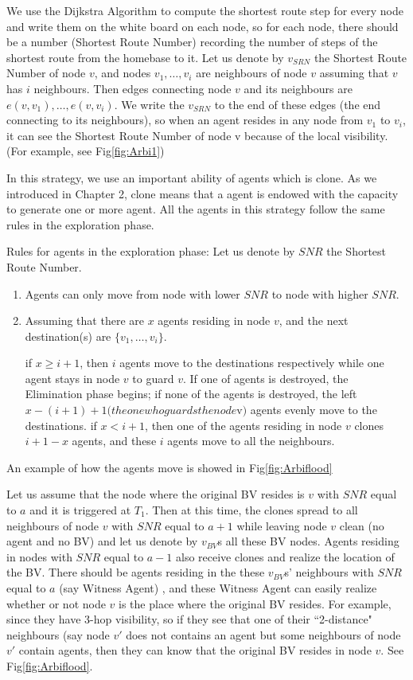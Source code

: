 We use the Dijkstra Algorithm to compute the shortest route step for every node and write them on the white board on each node, so for each node, there should be a number (Shortest Route Number) recording the number of steps of the shortest route from the homebase to it. Let us denote by $v_{SRN}$ the Shortest Route Number of node $v$, and nodes ${v_1, \ldots, v_i}$ are neighbours of node $v$ assuming that $v$ has $i$ neighbours. Then edges connecting node $v$ and its neighbours are $e(v, v_1), \ldots, e(v, v_i)$. We write the $v_{SRN}$ to the end of these edges (the end connecting to its neighbours), so when an agent resides in any node from $v_1$ to $v_i$, it can see the Shortest Route Number of node v because of the local visibility. (For example, see Fig\ref{fig:Arbi1}) 

In this strategy, we use an important ability of agents which is clone. As we introduced in Chapter 2, clone means that a agent is endowed with the capacity to generate one or more agent. All the agents in this strategy follow the same rules in the exploration phase.

Rules for agents in the exploration phase:
Let us denote by $SNR$ the Shortest Route Number.
\begin{enumerate}
\item Agents can only move from node with lower $SNR$ to node with higher $SNR$.
\item Assuming that there are $x$ agents residing in node $v$, and the next destination(s) are $\{v_1,\ldots, v_i\}$. 

        if $x\geq i+1$, then $i$ agents move to the destinations respectively while one agent stays in node $v$ to guard $v$. If one of agents is destroyed, the Elimination phase begins; if none of the agents is destroyed, the left $x-(i+1)+1(the one who guards the node $v$)$ agents evenly move to the destinations. 
        if $x< i+1$, then one of the agents residing in node $v$ clones $i+1-x$ agents, and these $i$ agents move to all the neighbours.
\end{enumerate}
An example of how the agents move is showed in Fig\ref{fig:Arbiflood}

Let us assume that the node where the original BV resides is $v$ with $SNR$ equal to $a$ and it is triggered at $T_1$. Then at this time, the clones spread to all neighbours of node $v$ with $SNR$ equal to $a+1$ while leaving node $v$ clean (no agent and no BV) and let us denote by $v_{BV}$s all these BV nodes.  Agents residing in nodes with $SNR$ equal to $a-1$ also receive clones and realize the location of the BV.  There should be agents residing in the these $v_{BV}$s' neighbours with $SNR$ equal to $a$ (say Witness Agent) , and these Witness Agent can easily realize whether or not node $v$ is the place where the original BV resides. For example, since they have 3-hop visibility, so if they see that one of their ``2-distance" neighbours (say node $v'$ does not contains an agent but some neighbours of node $v'$ contain agents, then they can know that the original BV resides in node $v$. See Fig\ref{fig:Arbiflood}.


